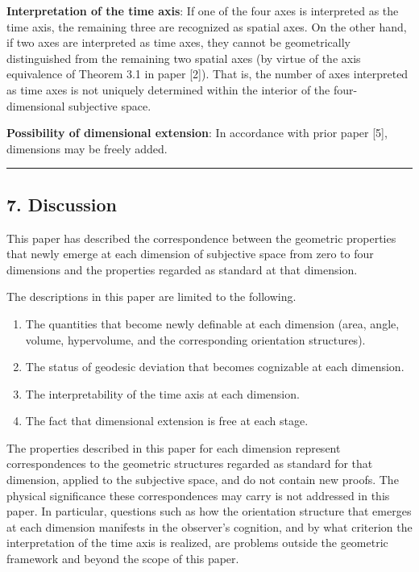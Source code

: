 \documentclass[a4paper,11pt]{article}
\theoremstyle{definition}
\providecommand{\tightlist}{\setlength{\itemsep}{0pt}\setlength{\parskip}{0pt}}
\begin{document}
\textbf{Interpretation of the time axis}: If one of the four axes is interpreted as the time axis, the remaining three are recognized as spatial axes. On the other hand, if two axes are interpreted as time axes, they cannot be geometrically distinguished from the remaining two spatial axes (by virtue of the axis equivalence of Theorem 3.1 in paper {[}2{]}). That is, the number of axes interpreted as time axes is not uniquely determined within the interior of the four-dimensional subjective space.

\textbf{Possibility of dimensional extension}: In accordance with prior paper {[}5{]}, dimensions may be freely added.

\begin{center}\rule{0.5\linewidth}{0.5pt}\end{center}

\subsection{7. Discussion}\label{discussion}

This paper has described the correspondence between the geometric properties that newly emerge at each dimension of subjective space from zero to four dimensions and the properties regarded as standard at that dimension.

The descriptions in this paper are limited to the following.

\begin{enumerate}
\def\labelenumi{\arabic{enumi}.}
\tightlist
\item
  The quantities that become newly definable at each dimension (area, angle, volume, hypervolume, and the corresponding orientation structures).
\item
  The status of geodesic deviation that becomes cognizable at each dimension.
\item
  The interpretability of the time axis at each dimension.
\item
  The fact that dimensional extension is free at each stage.
\end{enumerate}

The properties described in this paper for each dimension represent correspondences to the geometric structures regarded as standard for that dimension, applied to the subjective space, and do not contain new proofs. The physical significance these correspondences may carry is not addressed in this paper. In particular, questions such as how the orientation structure that emerges at each dimension manifests in the observer's cognition, and by what criterion the interpretation of the time axis is realized, are problems outside the geometric framework and beyond the scope of this paper.
\end{document}
